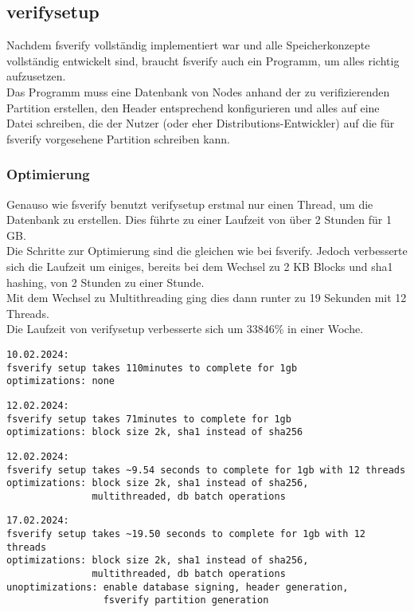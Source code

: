 \subsection{verifysetup}
Nachdem fsverify vollständig implementiert war und alle Speicherkonzepte vollständig entwickelt sind, braucht fsverify auch ein Programm, um alles richtig aufzusetzen.\\
Das Programm muss eine Datenbank von Nodes anhand der zu verifizierenden Partition erstellen, den Header entsprechend konfigurieren und alles auf eine Datei schreiben, die der Nutzer (oder eher Distributions-Entwickler) auf die für fsverify vorgesehene Partition schreiben kann.

\subsubsection{Optimierung}
Genauso wie fsverify benutzt verifysetup erstmal nur einen Thread, um die Datenbank zu erstellen. Dies führte zu einer Laufzeit von über 2 Stunden für 1 GB.\\
Die Schritte zur Optimierung sind die gleichen wie bei fsverify. Jedoch verbesserte sich die Laufzeit um einiges, bereits bei dem Wechsel zu 2 KB Blocks und sha1 hashing, von 2 Stunden zu einer Stunde.\\
Mit dem Wechsel zu Multithreading ging dies dann runter zu 19 Sekunden mit 12 Threads.
\\
Die Laufzeit von verifysetup verbesserte sich um 33846\% in einer Woche.
\begin{verbatim}
10.02.2024:
fsverify setup takes 110minutes to complete for 1gb
optimizations: none
\end{verbatim}
\begin{verbatim}
12.02.2024:
fsverify setup takes 71minutes to complete for 1gb
optimizations: block size 2k, sha1 instead of sha256
\end{verbatim}
\begin{verbatim}
12.02.2024:
fsverify setup takes ~9.54 seconds to complete for 1gb with 12 threads
optimizations: block size 2k, sha1 instead of sha256,
               multithreaded, db batch operations
\end{verbatim}
\begin{verbatim}
17.02.2024:
fsverify setup takes ~19.50 seconds to complete for 1gb with 12 threads
optimizations: block size 2k, sha1 instead of sha256,
               multithreaded, db batch operations
unoptimizations: enable database signing, header generation,
                 fsverify partition generation
\end{verbatim}

